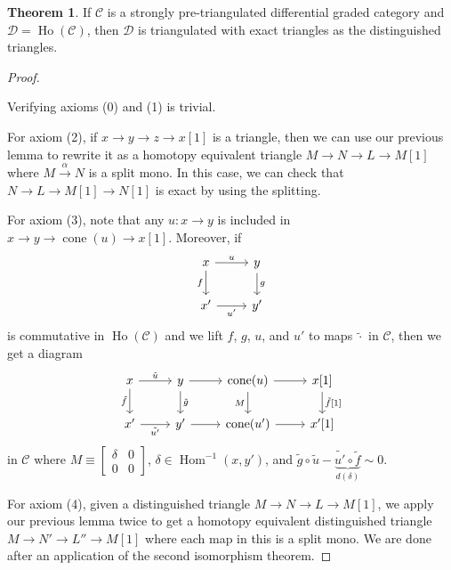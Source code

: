 \documentclass[10pt,letterpaper,cm]{nupset}
\theoremstyle{definition}
\theoremstyle{theorem}
\newtheorem{theorem}[definition]{Theorem}
\theoremstyle{remark}
\newcommand{\1}{\mathbf{1}}
\renewcommand{\c}{\mathscr{C}}
\renewcommand{\d}{\mathscr{D}}
\newcommand{\0}{\vec 0}
\DeclareMathOperator{\Hom}{Hom}
\DeclareMathOperator{\cone}{cone}
\DeclareMathOperator{\ho}{Ho}
\begin{document}
\begin{theorem}
If $\c$ is a strongly pre-triangulated differential graded category and $\d = \ho(\c)$, then $\d$ is triangulated with exact triangles as the distinguished triangles. 
\end{theorem}
\begin{proof} $ $

\smallskip

Verifying axioms (0) and (1) is trivial. 

\medskip

 For axiom (2), if $x \to y \to z \to x[1]$ is a triangle, then we can use our previous lemma to rewrite it as a homotopy equivalent triangle $M \to N \to L \to M[1]$ where $M \overset{\alpha}{\longrightarrow} N$ is a split mono. In this case, we can check that $N \to L \to M[1] \to N[1]$ is exact by using the splitting. 

\medskip

 For axiom (3), note that any $u : x \to y$ is included in $x \to y \to \cone(u) \to x[1]$. Moreover, if
\[
\begin{tikzcd}
x \arrow[r, "u"] \arrow[d, "f"'] & y \arrow[d, "g"] \\
x' \arrow[r, "u'"']              & y'              
\end{tikzcd}
\]
is commutative in $\ho(\c)$ and we lift $f$, $g$, $u$, and $u'$ to maps $\tilde{\cdot}$ in $\c$, then we get  a  diagram
\[
\begin{tikzcd}
x \arrow[r, "\tilde{u}"] \arrow[d, "\tilde{f}"'] & y \arrow[d, "\tilde{g}"] \arrow[r] & \cone(u) \arrow[d, "M"'] \arrow[r] & {x[1]} \arrow[d, "{\tilde{f}[1]}"] \\
x' \arrow[r, "\tilde{u'}"']                      & y' \arrow[r]                       & \cone(u') \arrow[r]                & {x'[1]}                           
\end{tikzcd}
\]
in $\c$ where $M \equiv \begin{bmatrix} \delta & 0 \\ 0 & 0 \end{bmatrix}$, $\delta \in \Hom^{-1}(x,y')$, and  $\tilde{g} \circ \tilde{u} - \underbrace{\tilde{u'} \circ \tilde{f}}_{d(\delta)} \sim 0.$

\medskip

 For axiom (4), given a distinguished triangle $M \to N \to L \to M[1]$, we apply our previous lemma twice to   get a homotopy equivalent distinguished triangle $M \to N' \to L'' \to M[1]$ where each map in this is a split mono.  We are done after an application of the second isomorphism theorem.
\end{proof}
\end{document}
